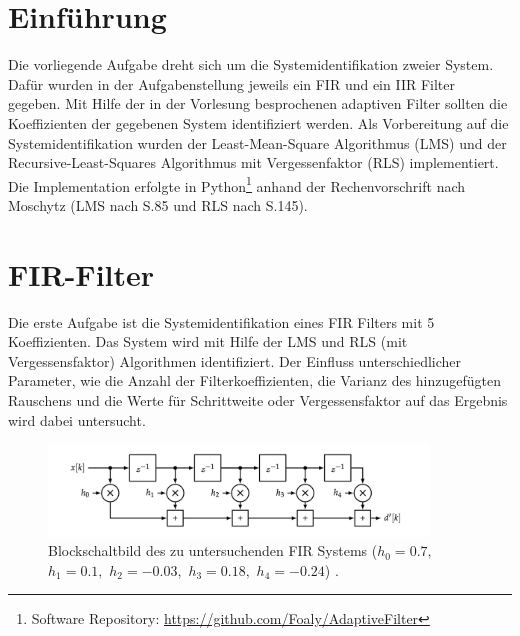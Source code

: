 \section{Einführung}
\label{sec:intor}

Die vorliegende Aufgabe dreht sich um die Systemidentifikation zweier System.
Dafür wurden in der Aufgabenstellung jeweils ein FIR und ein IIR Filter gegeben.
Mit Hilfe der in der Vorlesung besprochenen adaptiven Filter sollten die Koeffizienten der gegebenen System identifiziert werden.
Als Vorbereitung auf die Systemidentifikation wurden der Least-Mean-Square Algorithmus (LMS) und der Recursive-Least-Squares Algorithmus mit Vergessenfaktor (RLS) implementiert.
Die Implementation erfolgte in Python\footnote{Software Repository: \url{https://github.com/Foaly/AdaptiveFilter}} anhand der Rechenvorschrift nach Moschytz \cite{moschytz2000book} (LMS nach S.85 und RLS nach S.145).

\section{FIR-Filter}
\label{sec:fir}

Die erste Aufgabe ist die Systemidentifikation eines FIR Filters mit 5 Koeffizienten.
Das System wird mit Hilfe der LMS und RLS (mit Vergessensfaktor) Algorithmen identifiziert.
Der Einfluss unterschiedlicher Parameter, wie die Anzahl der Filterkoeffizienten, die Varianz des hinzugefügten Rauschens und die Werte für Schrittweite oder Vergessensfaktor auf das Ergebnis wird dabei untersucht.

\begin{figure}[H]
  \centering
      \includegraphics[width=0.9\textwidth]{figures/FIR_System.png}
 \caption{Blockschaltbild des zu untersuchenden FIR Systems (${h_0 = 0.7,}$ ${h_1 = 0.1,}$ ${h_2 = -0.03,}$ ${h_3 = 0.18,}$ ${h_4 = -0.24}$) \cite{aufgabenstellung}.}
	\label{fig:FIR_System}
\end{figure}

